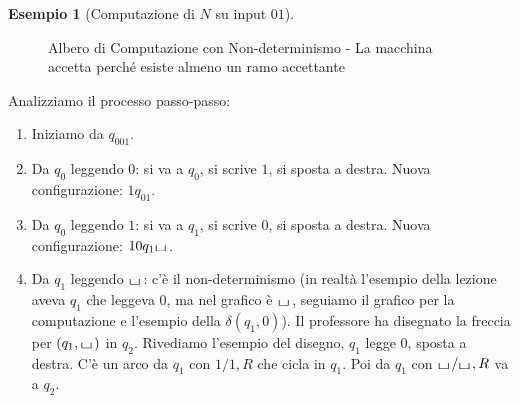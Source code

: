 \documentclass[a4paper]{article}
\theoremstyle{definition} %
\newtheorem{example}{Esempio}
\newcommand{\blankS}{\ensuremath{\raisebox{-0.15ex}{\scalebox{1.3}[0.7]{$\sqcup$}}\mkern2mu}}
\begin{document}
\begin{example}[Computazione di $N$ su input $01$]
\begin{figure}[h!]
    \caption{Albero di Computazione con Non-determinismo - La macchina accetta perché esiste almeno un ramo accettante}
\end{figure}
Analizziamo il processo passo-passo:
\begin{enumerate}
    \item Iniziamo da $q_001$.
    \item Da $q_0$ leggendo $0$: si va a $q_0$, si scrive $1$, si sposta a destra. Nuova configurazione: $1q_01$.
    \item Da $q_0$ leggendo $1$: si va a $q_1$, si scrive $0$, si sposta a destra. Nuova configurazione: $10q_1\blankS$.
    \item Da $q_1$ leggendo $\blankS$: c'è il non-determinismo (in realtà l'esempio della lezione aveva $q_1$ che leggeva $0$, ma nel grafico è $\blankS$, seguiamo il grafico per la computazione e l'esempio della $\delta(q_1,0)$). Il professore ha disegnato la freccia per $(q_1, \blankS)$ in $q_2$. Rivediamo l'esempio del disegno, $q_1$ legge $0$, sposta a destra. C'è un arco da $q_1$ con $1/1,R$ che cicla in $q_1$. Poi da $q_1$ con $\blankS/\blankS,R$ va a $q_2$.
    

\end{enumerate}
\end{example}
\end{document}
